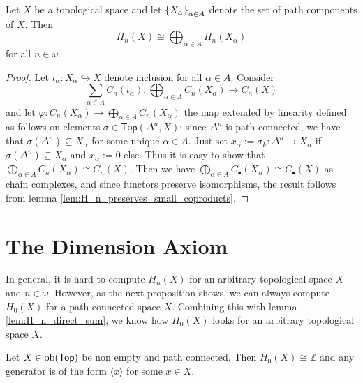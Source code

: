 \begin{lemma}
	\label{lem:H_n_direct_sum}
	Let $X$ be a topological space and let $\cbr{X_\alpha}_{\alpha \in A}$ denote the set of path components of $X$. Then
\begin{equation*}
	H_n(X) \cong \bigoplus_{\alpha \in A}H_n(X_\alpha)
\end{equation*}
\noindent for all $n \in \omega$.
\end{lemma}

\begin{proof}
	Let $\iota_\alpha : X_\alpha \hookrightarrow X$ denote inclusion for all $\alpha \in A$. Consider 
	\begin{equation*}
		\sum_{\alpha \in A}C_n(\iota_\alpha) : \bigoplus_{\alpha \in A} C_n(X_\alpha) \to C_n(X)
	\end{equation*}
	\noindent and let $\varphi : C_n(X_\alpha) \to \bigoplus_{\alpha \in A}C_n(X_\alpha)$ the map extended by linearity defined as follows on elements $\sigma \in \mathsf{Top}(\Delta^n,X)$: since $\Delta^n$ is path connected, we have that $\sigma(\Delta^n) \subseteq X_\alpha$ for some unique $\alpha \in A$. Just set $x_\alpha := \sigma_k : \Delta^n \to X_\alpha$ if $\sigma(\Delta^n) \subseteq X_\alpha$ and $x_\alpha := 0$ else. Thus it is easy to show that $\bigoplus_{\alpha \in A}C_n(X_\alpha) \cong C_n(X)$. Then we have $\bigoplus_{\alpha \in A}C_\bullet(X_\alpha) \cong C_\bullet(X)$ as chain complexes, and since functors preserve isomorphisms, the result follows from lemma \ref{lem:H_n_preserves_small_coproducts}.
\end{proof}

\section*{The Dimension Axiom}
In general, it is hard to compute $H_n(X)$ for an arbitrary topological space $X$ and $n \in \omega$. However, as the next proposition shows, we can always compute $H_0(X)$ for a path connected space $X$. Combining this with lemma \ref{lem:H_n_direct_sum}, we know how $H_0(X)$ looks for an arbitrary topological space $X$.

\begin{proposition}
	Let $X \in \operatorname{ob}(\mathsf{Top})$ be non empty and path connected. Then $H_0(X) \cong \mathbb{Z}$ and any generator is of the form $\langle x \rangle$ for some $x \in X$.
\end{proposition}

